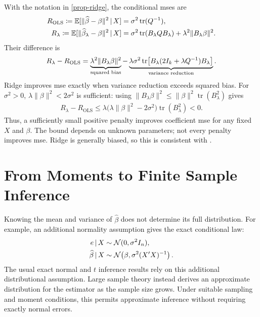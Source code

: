 \documentclass[a4paper,12pt]{article}
\begin{document}
\begin{remark}
	With the notation in \autoref{prop-ridge}, the conditional \glspl{mse} are
	\begin{align*}
		R_{\mathrm{OLS}}\coloneqq\operatorname{\mathbb{E}}[\|\widehat\beta-\beta\|^2\mathpunct{}|\mathpunct{} X]
		&=\sigma^2\operatorname{tr}(Q^{-1}),\\
		R_\lambda\coloneqq\operatorname{\mathbb{E}}[\|\widehat\beta_\lambda-\beta\|^2\mathpunct{}|\mathpunct{} X]
		&=\sigma^2\operatorname{tr}(B_\lambda Q B_\lambda)
		+\lambda^2\|B_\lambda\beta\|^2.
	\end{align*}
	Their difference is
	\begin{align*}
		R_\lambda-R_{\mathrm{OLS}}
		=\underbrace{\lambda^2\|B_\lambda\beta\|^2}_{\text{squared bias}}
		-\underbrace{\lambda\sigma^2\operatorname{tr}\!\left[B_\lambda(2I_k+\lambda Q^{-1})B_\lambda\right]}_{\text{variance reduction}}.
	\end{align*}
	Ridge improves \gls{mse} exactly when variance reduction exceeds squared bias.
	For $\sigma^2>0$, $\lambda\|\beta\|^2<2\sigma^2$ is sufficient:
	using $\|B_\lambda\beta\|^2\le\|\beta\|^2\operatorname{tr}(B_\lambda^2)$ gives
	\begin{align*}
		R_\lambda-R_{\mathrm{OLS}}
		\le\lambda\big(\lambda\|\beta\|^2-2\sigma^2\big)\operatorname{tr}(B_\lambda^2)<0.
	\end{align*}
	Thus, a sufficiently small positive penalty improves coefficient \gls{mse} for any fixed $X$ and $\beta$.
	The bound depends on unknown parameters; not every penalty improves \gls{mse}.
	Ridge is generally biased, so this is consistent with .
\end{remark}

\section{From Moments to Finite Sample Inference}

Knowing the mean and variance of $\widehat\beta$ does not determine its full distribution.
For example, an additional normality assumption gives the exact conditional law:
\begin{align}
	e\mathpunct{}|\mathpunct{} X&\sim\operatorname{\mathcal{N}}(0,\sigma^2 I_n),\label{eq-normal-errors}\\
	\widehat\beta\mathpunct{}|\mathpunct{} X&\sim\operatorname{\mathcal{N}}\!\left(\beta,\sigma^2(X^{\prime} X)^{-1}\right).\notag
\end{align}
The usual exact normal and $t$ inference results rely on this additional distributional assumption.
Large sample theory instead derives an approximate distribution for the estimator as the sample size grows.
Under suitable sampling and moment conditions, this permits approximate inference without requiring exactly normal errors.
\end{document}
